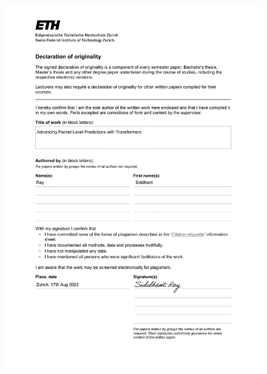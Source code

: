 \begin{figure}[!h]
  \begin{center}
    \includegraphics[scale=0.8]{figures/declaration.pdf}
    \label{fig:dec}
  \end{center}
\end{figure}

